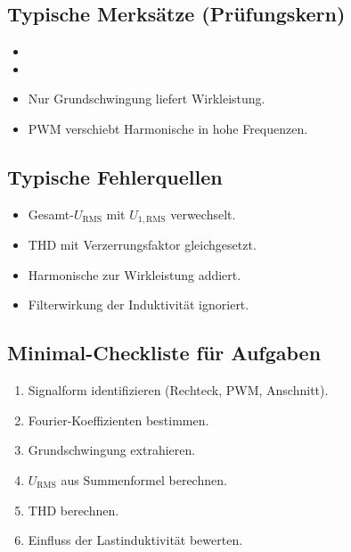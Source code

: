 \subsection{Typische Merksätze (Prüfungskern)}

\begin{itemize}
    \item {}
    \item {}
    \item Nur Grundschwingung liefert Wirkleistung.
    \item PWM verschiebt Harmonische in hohe Frequenzen.
\end{itemize}

\subsection{Typische Fehlerquellen}

\begin{itemize}
    \item Gesamt-$U_{\mathrm{RMS}}$ mit $U_{1,\mathrm{RMS}}$ verwechselt.
    \item THD mit Verzerrungsfaktor gleichgesetzt.
    \item Harmonische zur Wirkleistung addiert.
    \item Filterwirkung der Induktivität ignoriert.
\end{itemize}

\subsection{Minimal-Checkliste für Aufgaben}

\begin{enumerate}
    \item Signalform identifizieren (Rechteck, PWM, Anschnitt).
    \item Fourier-Koeffizienten bestimmen.
    \item Grundschwingung extrahieren.
    \item $U_{\mathrm{RMS}}$ aus Summenformel berechnen.
    \item THD berechnen.
    \item Einfluss der Lastinduktivität bewerten.
\end{enumerate}
